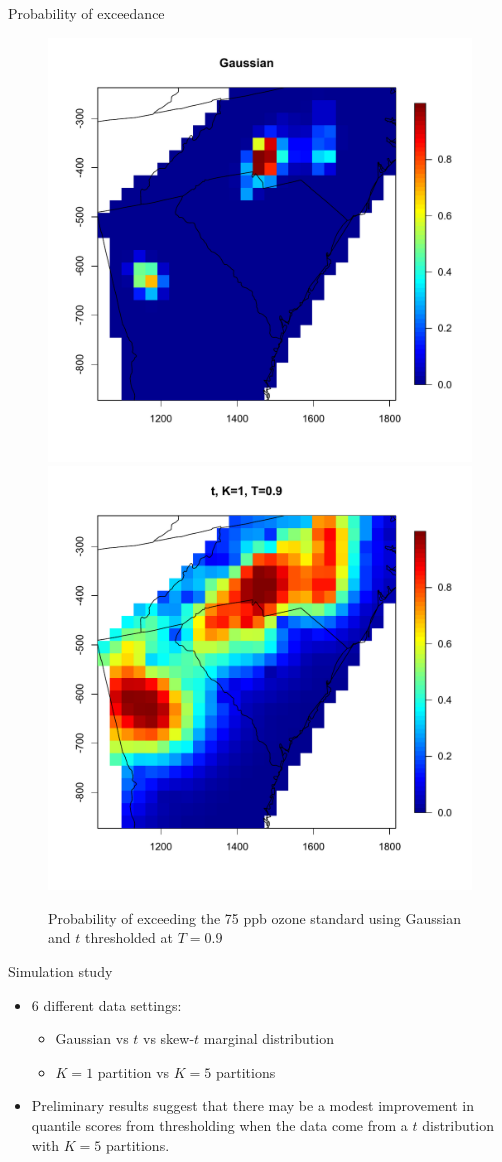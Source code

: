 \documentclass{beamer}
\begin{document}
\begin{frame}{Probability of exceedance}
\centering
\begin{figure}
    \includegraphics[width=.5\linewidth]{./plots/p-exceed-std-gau.pdf}
    \includegraphics[width=.5\linewidth]{./plots/p-exceed-std-t19.pdf}
    \caption{Probability of exceeding the 75 ppb ozone standard using Gaussian and $t$ thresholded at $T=0.9$}
\end{figure}
\end{frame}

\begin{frame}{Simulation study}
  \begin{itemize} \setlength{\itemsep}{0.5em}
    \item 6 different data settings:
    \begin{itemize}
    	\item Gaussian vs $t$ vs skew-$t$ marginal distribution
        \item $K=1$ partition vs $K=5$ partitions
    \end{itemize}
    \item Preliminary results suggest that there may be a modest improvement in quantile scores from thresholding when the data come from a $t$ distribution with $K=5$ partitions.
  \end{itemize}
\end{frame}
\end{document}
